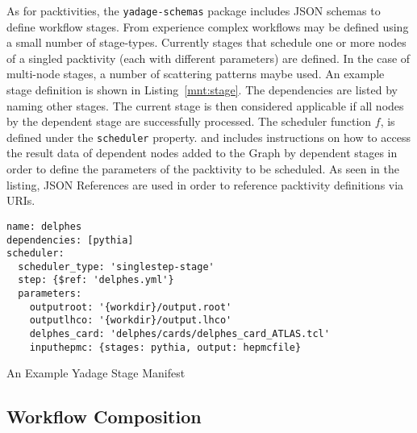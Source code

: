 \documentclass[a4paper]{jpconf}
\begin{document}
As for packtivities, the \verb+yadage-schemas+ package includes JSON schemas to define workflow stages. From experience complex workflows may be defined using a small number of stage-types. Currently stages that schedule one or more nodes of a singled packtivity (each with different parameters) are defined. In the case of multi-node stages, a number of scattering patterns maybe used. An example stage definition is shown in Listing~\ref{mnt:stage}. The dependencies are listed by naming other stages. The current stage is then considered applicable if all nodes by the dependent stage are successfully processed. The scheduler function $f$, is defined under the \verb+scheduler+ property. and includes instructions on how to access the result data of dependent nodes added to the Graph by dependent stages in order to define the parameters of the packtivity to be scheduled. As seen in the listing, JSON References are used in order to reference packtivity definitions via URIs.

\begin{listing}[!ht]
\begin{verbatim}
name: delphes
dependencies: [pythia]
scheduler:
  scheduler_type: 'singlestep-stage'
  step: {$ref: 'delphes.yml'}
  parameters:
    outputroot: '{workdir}/output.root'
    outputlhco: '{workdir}/output.lhco'
    delphes_card: 'delphes/cards/delphes_card_ATLAS.tcl'
    inputhepmc: {stages: pythia, output: hepmcfile}
\end{verbatim}
\caption{An Example Yadage Stage Manifest}
\label{mnt:stage}
\end{listing}

\subsection{Workflow Composition}
\end{document}
